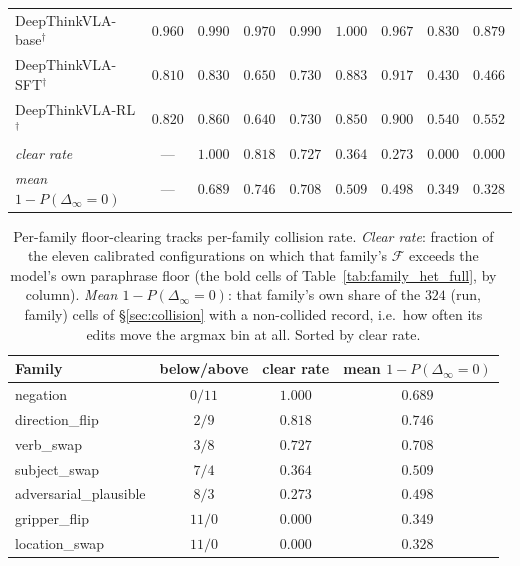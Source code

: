 \begin{table}[t]
{\begin{tabular}{lcccccccc}
DeepThinkVLA-base$^\dagger$ & $0.960$ & $\mathbf{0.990}$ & $\mathbf{0.970}$ & $\mathbf{0.990}$ & $\mathbf{1.000}$ & $\mathbf{0.967}$ & $0.830$ & $0.879$ \\
DeepThinkVLA-SFT$^\dagger$  & $0.810$ & $\mathbf{0.830}$ & $0.650$          & $0.730$          & $\mathbf{0.883}$ & $\mathbf{0.917}$ & $0.430$ & $0.466$ \\
DeepThinkVLA-RL$^\dagger$   & $0.820$ & $\mathbf{0.860}$ & $0.640$          & $0.730$          & $\mathbf{0.850}$ & $\mathbf{0.900}$ & $0.540$ & $0.552$ \\
\midrule
\emph{clear rate}                    & --- & $1.000$ & $0.818$ & $0.727$ & $0.364$ & $0.273$ & $0.000$ & $0.000$ \\
\emph{mean $1{-}P(\Delta_\infty{=}0)$} & --- & $0.689$ & $0.746$ & $0.708$ & $0.509$ & $0.498$ & $0.349$ & $0.328$ \\
\bottomrule
\end{tabular}}
\end{table}

\begin{table}[t]
\centering\small
\caption{Per-family floor-clearing tracks per-family collision rate. \emph{Clear rate}: fraction of the eleven calibrated configurations on which that family's $\mathcal{F}$ exceeds the model's own paraphrase floor (the bold cells of Table~\ref{tab:family_het_full}, by column). \emph{Mean $1{-}P(\Delta_\infty{=}0)$}: that family's own share of the $324$ (run, family) cells of \S\ref{sec:collision} with a non-collided record, i.e.\ how often its edits move the argmax bin at all. Sorted by clear rate.}
\label{tab:family_het}
\begin{tabular}{lccc}
\toprule
Family & below/above & clear rate & mean $1{-}P(\Delta_\infty{=}0)$ \\
\midrule
negation               & $0/11$  & $1.000$ & $0.689$ \\
direction\_flip        & $2/9$   & $0.818$ & $0.746$ \\
verb\_swap             & $3/8$   & $0.727$ & $0.708$ \\
subject\_swap          & $7/4$   & $0.364$ & $0.509$ \\
adversarial\_plausible & $8/3$   & $0.273$ & $0.498$ \\
gripper\_flip          & $11/0$  & $0.000$ & $0.349$ \\
location\_swap         & $11/0$  & $0.000$ & $0.328$ \\
\bottomrule
\end{tabular}
\end{table}

